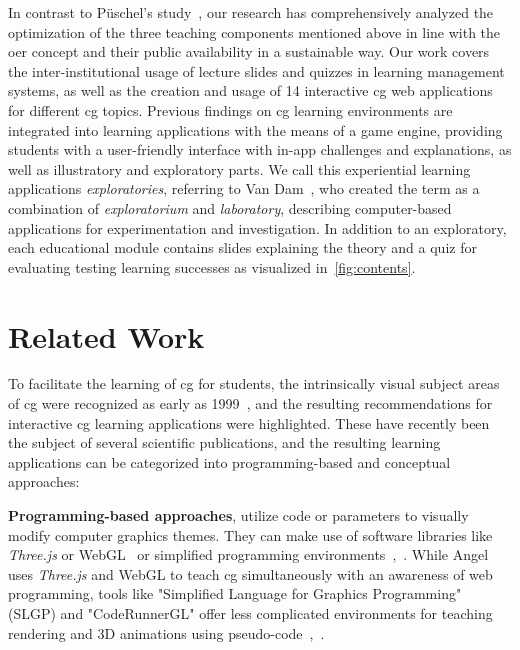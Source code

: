 In contrast to Püschel's study~\cite{pueschel:2013:MRCG}, our research has comprehensively analyzed the optimization of the three teaching components mentioned above in line with the \acrshort{oer} concept and their public availability in a sustainable way. Our work covers the inter-institutional usage of lecture slides and quizzes in learning management systems, as well as the creation and usage of 14 interactive \acrshort{cg} web applications for different \acrshort{cg} topics. Previous findings on \acrshort{cg} learning environments are integrated into learning applications with the means of a game engine, providing students with a user-friendly interface with in-app challenges and explanations, as well as illustratory and exploratory parts. We call this experiential learning applications \emph{exploratories}, referring to Van Dam~\cite{vanDam:1999:education}, who created the term as a combination of \emph{exploratorium} and \emph{laboratory}, describing computer-based applications for experimentation and investigation. In addition to an exploratory, each educational module contains slides explaining the theory and a quiz for evaluating testing learning successes as visualized in~\autoref{fig:contents}.



\section{Related Work} %
To facilitate the learning of \acrshort{cg} for students, the intrinsically visual subject areas of \acrshort{cg} were recognized as early as 1999~\cite{Balreira:2017:topics-cg-teaching}, and the resulting recommendations for interactive \acrshort{cg} learning applications were highlighted. These have recently been the subject of several scientific publications, and the resulting learning applications can be categorized into programming-based and conceptual approaches:

\textbf{Programming-based approaches}, utilize code or parameters to visually modify computer graphics themes. They can make use of software libraries like \emph{Three.js} or WebGL~\cite{angel:2017:interactive} or simplified programming environments~\cite{Sueyasu:2010:cg-tool},~\cite{Lobb:2016:cg-tool}. While Angel~\cite{angel:2017:interactive} uses \emph{Three.js} and WebGL to teach \acrshort{cg} simultaneously with an awareness of web programming, tools like "Simplified Language for Graphics Programming" (SLGP) and "CodeRunnerGL" offer less complicated environments for teaching rendering and 3D animations using pseudo-code~\cite{Sueyasu:2010:cg-tool},~\cite{Lobb:2016:cg-tool}.

